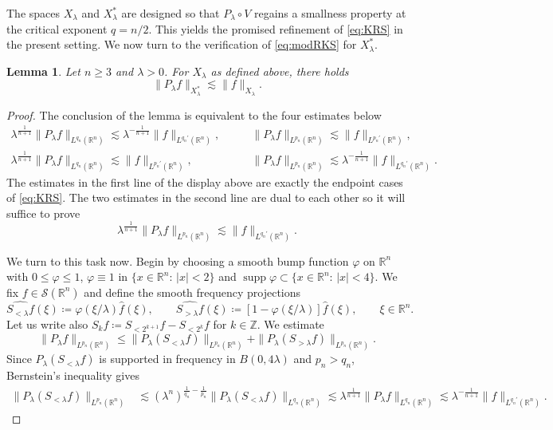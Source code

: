 \documentclass[11pt,a4paper]{amsart}
\newtheorem{lemma}[proposition]{Lemma}
\theoremstyle{remark}
\theoremstyle{definition}
\DeclareMathOperator{\supp}{supp}
\newcommand{\R}{\mathbb{R}}
\newcommand{\Z}{\mathbb{Z}}
\def\lec{\lesssim}
\def\vp{\varphi}
\def\wh{\widehat}
\begin{document}
The spaces $X_\lambda$ and $X_\lambda^*$ are designed so that $P_\lambda\circ V$ regains a smallness property at the critical exponent $q=n/2$. This yields the promised refinement of \eqref{eq:KRS} in the present setting. We now turn to the verification of \eqref{eq:modRKS} for $X_\lambda^*$.

\begin{lemma}\sl \label{lem:modRKS} Let $n\geq 3$ and $\lambda>0$. For $X_\lambda$ as defined above, there holds
\[
\|P_\lambda f\|_{X_\lambda ^*} \lesssim \|f\|_{X_\lambda}.
\]
\end{lemma}

\begin{proof} The conclusion of the lemma is equivalent to the four estimates below
\[
\begin{split}
\lambda^{\frac{1}{n+1}}\|P_\lambda f\|_{L^{q_n}(\R^n)}\lesssim  \lambda^{-\frac{1}{n+1}}\|f\|_{L^{q_n '}(\R^n)},&\qquad \|P_\lambda f\|_{L^{p_n}(\R^n)}\lesssim \|f\|_{L^{p_n '}(\R^n)},
\\
\lambda^{\frac{1}{n+1}}\|P_\lambda f\|_{L^{q_n}(\R^n)}\lesssim \|f\|_{L^{p_n '}(\R^n)},&
\qquad \|P_\lambda f\|_{L^{p_n}(\R^n)}\lesssim  \lambda^{-\frac{1}{n+1}}\|f\|_{L^{q_n '}(\R^n)}.
\end{split}
\]
The estimates in the first line of the display above are exactly the endpoint cases of \eqref{eq:KRS}. The two estimates in the second line are dual to each other so it will suffice to prove
\begin{equation}\label{eq:RKSsdual}
      \lambda^{\frac{1}{n+1}}\|P_\lambda f\|_{L^{p_n}(\R^n)}\lesssim \|f\|_{L^{q_n '}(\R^n)}.
\end{equation}

We turn to this task now. Begin by choosing a smooth bump function $\vp$ on $\R^n$ with $0\leq \vp\leq 1$, $\vp \equiv 1$ in $\{ x\in \R^n : \, |x|<2 \}$ and $\supp \vp \subset \{x\in\R^n: \, |x|< 4\}$. We fix $f\in \mathcal S(\R^n)$ and define the smooth frequency projections
\[
\wh{S_{<\lambda}f}(\xi) \coloneqq \vp ( \xi/\lambda ) \wh{f}(\xi),\qquad \wh{S_{>\lambda}f}(\xi) \coloneqq [ 1 - \vp ( \xi/\lambda ) ] \wh{f}(\xi),\qquad \xi\in\R^n.
\]
Let us write also $S_k f \coloneqq S_{<2^{k+1}}f-S_{<2^k}f$ for $k\in\Z$. We estimate
\begin{equation}\label{eq:resolvent_projections_split}
\|P_\lambda f \|_{L^{p_n}(\R^n)} \leq \| P_\lambda(S_{<\lambda} f) \|_{L^{p_n}(\R^n)} + \| P_\lambda(S_{>\lambda}f) \|_{L^{p_n}(\R^n)}.
\end{equation}
Since $P_\lambda(S_{<\lambda}f)$ is supported in frequency in $B(0,4\lambda)$ and
$p_n>q_n$, Bernstein's inequality gives
\begin{align*}
 \| P_\lambda(S_{<\lambda} f) \|_{L^{p_n}(\R^n)} &\lec (\lambda^n)^{\frac{1}{q_n} - \frac{1}{p_n}}  \| P_\lambda(S_{<\lambda} f) \|_{L^{q_n}(\R^n)} \lec \lambda^{\frac{1}{n+1}} \| P_\lambda f \|_{L^{q_n}(\R^n)}\lesssim \lambda^{- \frac{1}{n+1}} \| f \|_{L^{q_n'}(\R^n)}.
 \end{align*}


\end{proof}
\end{document}
